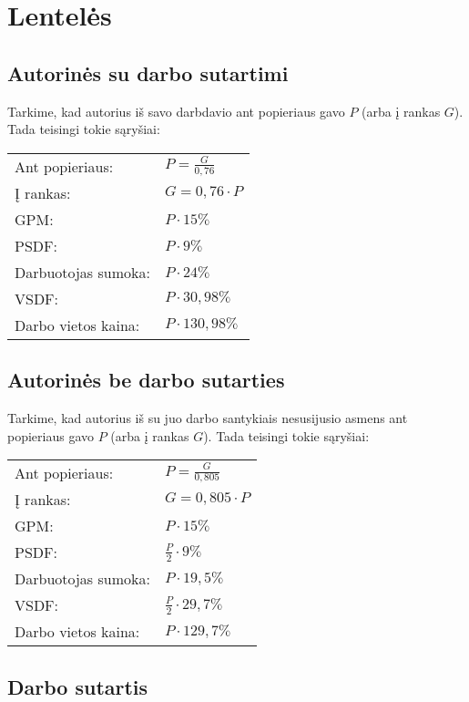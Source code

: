 \chapter{Lentelės}

\section{Autorinės su darbo sutartimi}

Tarkime, kad autorius iš savo darbdavio ant popieriaus gavo $P$ (arba
į rankas $G$). Tada teisingi tokie sąryšiai:

\begin{tabularx}{15cm}{p{7.5cm}|p{7.5cm}}
  Ant popieriaus: & $P = \frac{G}{0,76}$ \\
  Į rankas: & $G = 0,76 \cdot P$ \\
  GPM: & $P \cdot 15\%$ \\
  PSDF: & $P \cdot 9\%$ \\
  Darbuotojas sumoka: & $P \cdot 24\%$ \\
  VSDF: & $P \cdot 30,98\%$ \\
  Darbo vietos kaina: & $P \cdot 130,98\%$ \\
\end{tabularx}

\section{Autorinės be darbo sutarties}

Tarkime, kad autorius iš su juo darbo santykiais nesusijusio
asmens ant popieriaus gavo $P$ (arba į rankas $G$). Tada teisingi tokie
sąryšiai:

\begin{tabularx}{15cm}{p{7.5cm}|p{7.5cm}}
  Ant popieriaus: & $P = \frac{G}{0,805}$ \\
  Į rankas: & $G = 0,805 \cdot P$ \\
  GPM: & $P \cdot 15\%$ \\
  PSDF: & $\frac{P}{2} \cdot 9\%$ \\
  Darbuotojas sumoka: & $P \cdot 19,5\%$ \\
  VSDF: & $\frac{P}{2} \cdot 29,7\%$ \\
  Darbo vietos kaina: & $P \cdot 129,7\%$ \\
\end{tabularx}

\section{Darbo sutartis}

